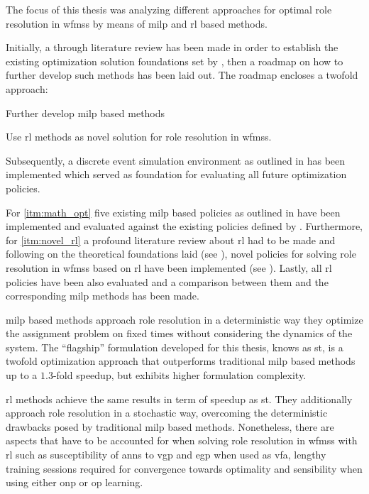 The focus of this thesis was analyzing different approaches for optimal role resolution in \glspl{wfms} by means of \gls{milp} and \gls{rl} based methods.

Initially, a through literature review has been made in order to establish the existing optimization solution \ie foundations set by \citet{Zeng2005}, then a roadmap on how to further develop such methods has been laid out. The roadmap encloses a twofold approach:
\begin{enumerate*}[ref=Approach \Roman*]
 	\item Further develop \gls{milp} based methods \label{itm:math_opt}
 	\item Use \gls{rl} methods as novel solution for role resolution in \glspl{wfms}. \label{itm:novel_rl}
 \end{enumerate*} 

Subsequently, a discrete event simulation environment as outlined in  has been implemented which served as foundation for evaluating all future optimization policies.

For \ref{itm:math_opt} five existing \gls{milp} based policies as outlined in  have been implemented and evaluated against the existing policies defined by \citet[pp. 13--14]{Zeng2005}. Furthermore, for \ref{itm:novel_rl} a profound literature review about \gls{rl} had to be made and following on the theoretical foundations laid (see ), novel policies for solving role resolution in \glspl{wfms} based on \gls{rl} have been implemented (see ). Lastly, all \gls{rl} policies have been also evaluated and a comparison between them and the corresponding \gls{milp} methods has been made.

\gls{milp} based methods approach role resolution in a deterministic way \ie they optimize the assignment problem on fixed times without considering the dynamics of the system. The ``flagship'' formulation developed for this thesis, knows as \gls{st}, is a twofold optimization approach that outperforms traditional \gls{milp} based methods up to a $1.3$-fold speedup, but exhibits higher formulation complexity. 

\gls{rl} methods achieve the same results in term of speedup as \gls{st}. They additionally approach role resolution in a stochastic way, overcoming the deterministic drawbacks posed by traditional \gls{milp} based methods. Nonetheless, there are aspects that have to be accounted for when solving role resolution in \glspl{wfms} with \gls{rl} such as susceptibility of \glspl{ann} to \gls{vgp} and \gls{egp} when used as \gls{vfa}, lengthy training sessions required for convergence towards optimality and sensibility when using either \gls{onp} or \gls{op} learning.

